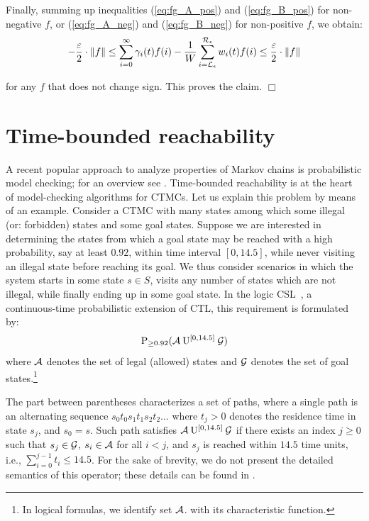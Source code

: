 \documentclass[a4paper,11pt]{article}
\newcommand{\Section}[1]{\section{#1}}
\newenvironment{proof}{\trivlist \item[\hskip \labelsep{\bf Proof}]}{\hfill\hbox{$\Box$}\endtrivlist}
\begin{document}
\begin{proof}
		Finally, summing up inequalities (\ref{eq:fg_A_pos}) and (\ref{eq:fg_B_pos}) for non-negative $f$, or (\ref{eq:fg_A_neg}) and (\ref{eq:fg_B_neg}) for non-positive $f$, we obtain:
		\begin{equation}
			- \frac{\varepsilon}{2} \cdot \|f\| \leq \sum_{i=0}^{\infty} \gamma_{i}(t) f(i) - \frac{1}{W}\sum_{i = \mathcal{L}_{\epsilon}}^{\mathcal{R}_{\epsilon}} w_{i}(t) f(i) \leq \frac{\varepsilon}{2} \cdot \|f\| \nonumber
		\end{equation}
		
		for any $f$ that does not change sign.  This proves the claim.
	\end{proof}

\Section{Time-bounded reachability \label{s:time_b_r}}

		A recent popular approach to analyze properties of Markov chains is probabilistic model checking; for an overview see \cite{Kwiatkowska_SLCS03}.  Time-bounded reachability is at the heart of model-checking algorithms for CTMCs.  Let us explain this problem by means of an example. Consider a CTMC with many states among which some illegal (or: forbidden) states and some goal states.  Suppose we are interested in determining the states from which a goal state may be reached with a high probability, say at least $0.92$, within time interval $[0,14.5]$, while never visiting an illegal state before reaching its goal. We thus consider scenarios in which the system starts in some state $s \in S$, visits any number of states which are not illegal, while finally ending up in some goal state.  In the logic CSL~\cite{AzizSSB_ACMTCL00,BaierHHK_TSE03}, a continuous-time probabilistic extension of CTL,  this requirement is formulated by:
		\begin{equation}
			\mathrm{P}_{\geq 0.92}(\mathcal{A} \: \mathrm{U}^{[0,14.5]} \: \mathcal{G}) \nonumber
		\end{equation}
		where $\mathcal{A}$ denotes the set of legal (allowed) states and $\mathcal{G}$ denotes the set of goal states.\footnote{In logical formulas, we identify set $\mathcal{A}$. with its characteristic function.}
		
		The part between parentheses characterizes a set of paths, where a single path is an alternating sequence $s_{0}t_{0}s_{1}t_{1}s_{2}t_{2}\ldots$ where $t_{j} > 0$ denotes the residence time in state $s_{j}$, and $s_{0} = s$.  Such path satisfies $\mathcal{A} \: \mathrm{U}^{[0,14.5]} \: \mathcal{G}$ if there exists an index $j \geq 0$ such that $s_{j} \in \mathcal{G}$, $s_i \in \mathcal{A}$ for all $i < j$, and $s_{j}$ is reached within $14.5$ time units, i.e., $\sum_{i=0}^{j{-}1}t_{i} \leq 14.5$.  For the sake of brevity, we do not present the detailed semantics of this operator; these details can be found in \cite{AzizSSB_ACMTCL00,BaierHHK_TSE03}.
	
\end{document}
